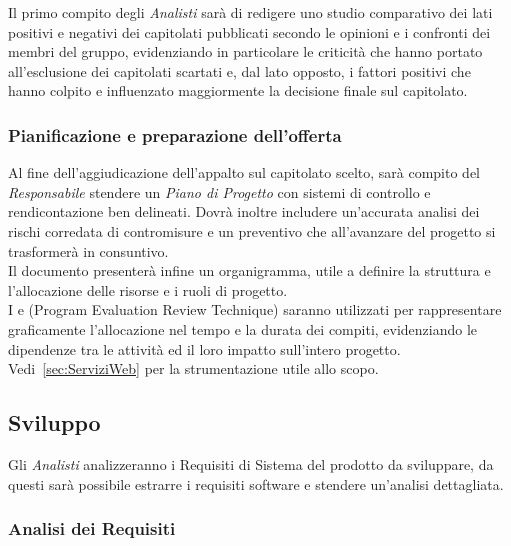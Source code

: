 \documentclass{scalatekids-article}
\begin{document}
Il primo compito degli \textit{Analisti} sarà di redigere uno studio comparativo
dei lati positivi e negativi dei capitolati pubblicati secondo le opinioni e i
confronti dei membri del gruppo, evidenziando in particolare le criticità che
hanno portato all'esclusione dei capitolati scartati e, dal lato opposto, i
fattori positivi che hanno colpito e influenzato maggiormente la decisione
finale sul capitolato.

\subsubsection{Pianificazione e preparazione dell'offerta}

Al fine dell'aggiudicazione dell'appalto sul capitolato scelto, sarà compito del
\textit{Responsabile} stendere un \textit{Piano di Progetto} con sistemi di
controllo e rendicontazione ben delineati. Dovrà inoltre includere un'accurata
analisi dei rischi corredata di contromisure e un preventivo che all'avanzare
del progetto si trasformerà in consuntivo.\\
Il documento presenterà infine un organigramma, utile a definire la struttura
e l'allocazione delle risorse e i ruoli di progetto.\\
I  e  (Program Evaluation Review
Technique) saranno utilizzati per rappresentare graficamente l'allocazione nel
tempo e la durata dei compiti, evidenziando le dipendenze tra le attività ed
il loro impatto sull'intero progetto.\\
Vedi~\ref{sec:ServiziWeb} per la strumentazione utile allo scopo.

\subsection{Sviluppo}

Gli \textit{Analisti} analizzeranno i Requisiti di Sistema del prodotto da
sviluppare, da questi sarà possibile estrarre i requisiti software e stendere un'analisi dettagliata.

\subsubsection{Analisi dei Requisiti}
\end{document}
